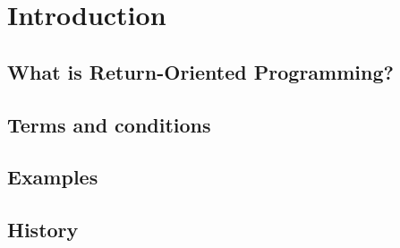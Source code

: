 \section{Introduction}
\subsection{What is Return-Oriented Programming?}



\subsection{Terms and conditions}



\subsection{Examples}



\subsection{History}
